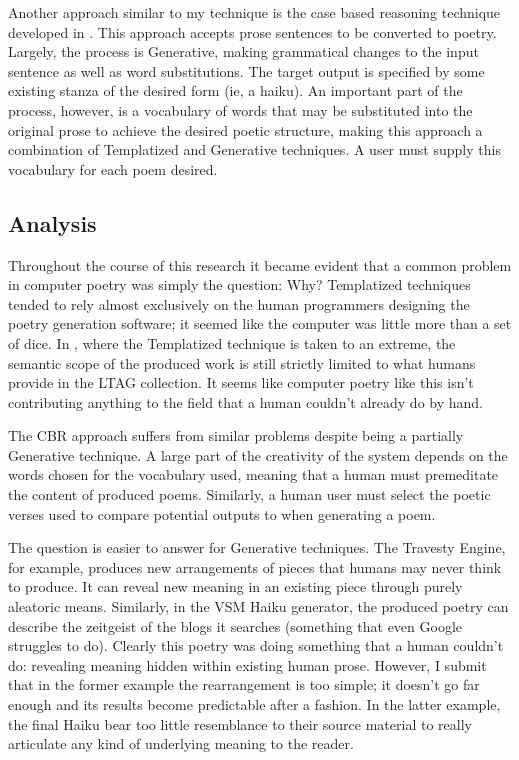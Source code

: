 \documentclass[10pt]{article}
\begin{document}
Another approach similar to my technique is the case based reasoning technique
developed in \cite{Gervas01}. This approach accepts prose sentences to be
converted to poetry. Largely, the process is Generative, making grammatical
changes to the input sentence as well as word substitutions. The target output
is specified by some existing stanza of the desired form (ie, a haiku). An
important part of the process, however, is a vocabulary of words that may be
substituted into the original prose to achieve the desired poetic structure,
making this approach a combination of Templatized and Generative techniques. A
user must supply this vocabulary for each poem desired.

\subsection{Analysis}
Throughout the course of this research it became evident that a common problem in
computer poetry was simply the question: Why? Templatized techniques tended to
rely almost exclusively on the human programmers designing the poetry
generation software; it seemed like the computer was little more than a set of
dice. In \cite{Manurung03}, where the Templatized technique is taken to an
extreme, the semantic scope of the produced work is still strictly limited to
what humans provide in the LTAG collection. It seems like computer poetry like
this isn't contributing anything to the field that a human couldn't already do
by hand.

The CBR approach suffers from similar problems despite being a partially Generative technique.
A large part of the creativity of the system depends on the words chosen for
the vocabulary used, meaning that a human must premeditate the content of
produced poems. Similarly, a human user must select the poetic verses used to
compare potential outputs to when generating a poem.

The question is easier to answer for Generative techniques. The Travesty
Engine, for example, produces new arrangements of pieces that humans may never
think to produce. It can reveal new meaning in an existing piece through purely
aleatoric means. Similarly, in the VSM Haiku generator, the produced poetry can
describe the zeitgeist of the blogs it searches (something that even Google
struggles to do). Clearly this poetry was doing something that a human couldn't
do: revealing meaning hidden within existing human prose. However, I submit
that in the former example the rearrangement is too simple; it doesn't go far
enough and its results become predictable after a fashion. In the latter
example, the final Haiku bear too little resemblance to their source material
to really articulate any kind of underlying meaning to the reader.
\end{document}
